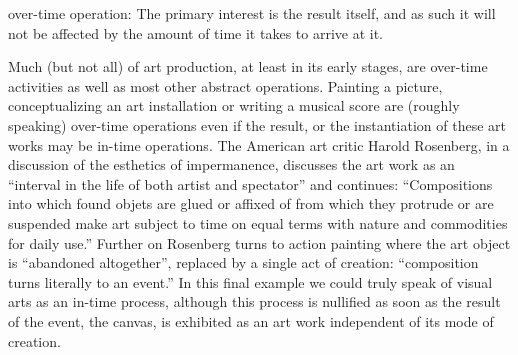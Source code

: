 over-time operation: The primary interest is the result itself, and as such it will not be affected by the amount of time it takes to arrive at it. 

Much (but not all) of art production, at least in its early stages, are over-time activities as well as most other abstract operations. Painting a picture, conceptualizing an art installation or writing a musical score are (roughly speaking) over-time operations even if the result, or the instantiation of these art works may be in-time operations. The American art critic Harold Rosenberg, in a discussion of the esthetics of impermanence, discusses the art work as an ``interval in the life of both artist and spectator'' and continues: ``Compositions into which found objets are glued or affixed of from which they protrude or are suspended make art subject to time on equal terms with nature and commodities for daily use.'' \parencite[92]{rosenberg66} Further on Rosenberg turns to action painting where the art object is ``abandoned altogether'', replaced by a single act of creation: ``composition turns literally to an event.'' \parencite[93]{rosenberg66} In this final example we could truly speak of visual arts as an in-time process, although this process is nullified as soon as the result of the event, the canvas, is exhibited as an art work independent of its mode of creation.



